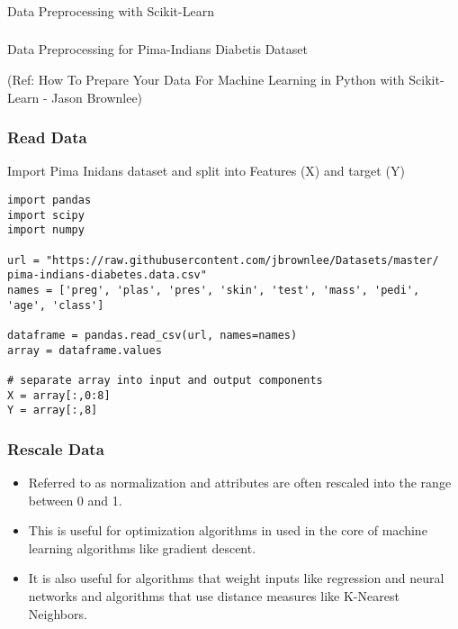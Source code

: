 \begin{frame}[fragile]\frametitle{}
\begin{center}
{\Large Data Preprocessing with Scikit-Learn}
\end{center}
\end{frame}

\begin{frame}[fragile]\frametitle{}
\begin{center}
{\Large Data Preprocessing for Pima-Indians Diabetis Dataset}

{\tiny (Ref: How To Prepare Your Data For Machine Learning in Python with Scikit-Learn - Jason Brownlee)}
\end{center}
\end{frame}

\begin{frame}[fragile]\frametitle{Read Data}
Import Pima Inidans dataset and split into Features (X) and target (Y)
\begin{lstlisting}
import pandas
import scipy
import numpy

url = "https://raw.githubusercontent.com/jbrownlee/Datasets/master/ pima-indians-diabetes.data.csv"
names = ['preg', 'plas', 'pres', 'skin', 'test', 'mass', 'pedi', 'age', 'class']

dataframe = pandas.read_csv(url, names=names)
array = dataframe.values

# separate array into input and output components
X = array[:,0:8]
Y = array[:,8]
\end{lstlisting}
\end{frame}

\begin{frame}[fragile]\frametitle{Rescale Data}

	\begin{itemize}
	\item Referred to as normalization and attributes are often rescaled into the range between 0 and 1. 
	\item This is useful for optimization algorithms in used in the core of machine learning algorithms like gradient descent. 
	\item It is also useful for algorithms that weight inputs like regression and neural networks and algorithms that use distance measures like K-Nearest Neighbors.
	\end{itemize}
	
\end{frame}

